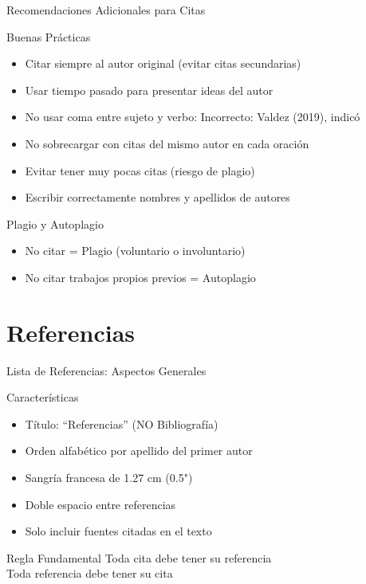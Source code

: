 \documentclass[spanish,aspectratio=169]{beamer}
\begin{document}
\begin{frame}{Recomendaciones Adicionales para Citas}
	\begin{block}{Buenas Prácticas}
		\begin{itemize}
			\item Citar siempre al autor original (evitar citas secundarias)
			\item Usar tiempo pasado para presentar ideas del autor
			\item No usar coma entre sujeto y verbo: \alert{Incorrecto:} Valdez (2019), indicó
			\item No sobrecargar con citas del mismo autor en cada oración
			\item Evitar tener muy pocas citas (riesgo de plagio)
			\item Escribir correctamente nombres y apellidos de autores
		\end{itemize}
	\end{block}
	
	\begin{alertblock}{Plagio y Autoplagio}
		\begin{itemize}
			\item No citar = Plagio (voluntario o involuntario)
			\item No citar trabajos propios previos = Autoplagio
		\end{itemize}
	\end{alertblock}
\end{frame}

\section{Referencias}

\begin{frame}{Lista de Referencias: Aspectos Generales}
	\begin{block}{Características}
		\begin{itemize}
			\item Título: ``Referencias'' (NO Bibliografía)
			\item Orden alfabético por apellido del primer autor
			\item Sangría francesa de 1.27 cm (0.5")
			\item Doble espacio entre referencias
			\item Solo incluir fuentes citadas en el texto
		\end{itemize}
	\end{block}
	
	\begin{alertblock}{Regla Fundamental}
		\Large
		\centering
		Toda cita debe tener su referencia\\
		Toda referencia debe tener su cita
	\end{alertblock}
\end{frame}
\end{document}
